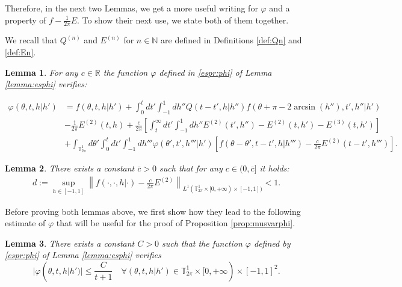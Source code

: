 \documentclass[a4paper,10pt,reqno]{amsart}
\newtheorem{lemma}{Lemma}[section]
\numberwithin{equation}{subsection}
\numberwithin{figure}{subsection}
\begin{document}
Therefore, in the next two Lemmas, we get a more useful writing for $\varphi$ and a property of $f-\frac{1}{2\pi}E$. To show their next use, we state both of them together.

We recall that $Q^{(n)}$ and $E^{(n)}$ for $n\in\mathbb{N}$ are defined in Definitions \ref{def:Qn} and \ref{def:En}.
\begin{lemma}\label{lemma:phimeglio}
For any $c\in\mathbb{R}$ the function $\varphi$ defined in \eqref{espr:phi} of Lemma \ref{lemma:esphi} verifies:

{\scriptsize\begin{align*}
\varphi(\theta,t,h|h')&=f(\theta,t,h|h')+\int_0^tdt'\int_{-1}^1dh''Q(t-t',h|h'')f(\theta+\pi-2\arcsin(h''),t',h''|h')
\\
&-\frac{1}{2\pi}E^{(2)}(t,h)+\frac{c}{2\pi}\left[\int_t^{\infty}dt'\int_{-1}^1dh''E^{(2)}(t',h'')-E^{(2)}(t,h')-E^{(3)}(t,h')\right]
\\
&+\int_{\mathbb{T}^1_{2\pi}}d\theta'\int_0^tdt'\int_{-1}^1dh'''\varphi(\theta',t',h'''|h')\left[f(\theta-\theta',t-t',h|h''')-\frac{c}{2\pi}E^{(2)}(t-t',h''')\right].
\end{align*}}

\end{lemma}
\begin{lemma}\label{lemmaok}
There exists a constant $\bar c>0$ such that for any $c\in(0,\bar c]$ it holds:
\begin{align*}
d:=\sup_{h\in[-1,1]}\left\|f(\cdot,\cdot,h|\cdot)-\frac{c}{2\pi}E^{(2)}\right\|_{L^1(\mathbb{T}^1_{2\pi}\times[0,+\infty)\times[-1,1])}<1.
\end{align*}

\end{lemma}
Before proving both lemmas above, we first show how they lead to the following estimate of $\varphi$ that will be useful for the proof of Proposition \ref{prop:musvarphi}.
\begin{lemma}\label{decphi}
There exists a constant $C>0$ such that the function $\varphi$ defined by \eqref{espr:phi} of Lemma \ref{lemma:esphi} verifies
\[
|\varphi(\theta,t,h|h')|\leq\frac{C}{t+1}\quad\forall(\theta,t,h|h')\in\mathbb{T}^1_{2\pi}\times[0,+\infty)\times[-1,1]^2.
\]
\end{lemma}
\end{document}
